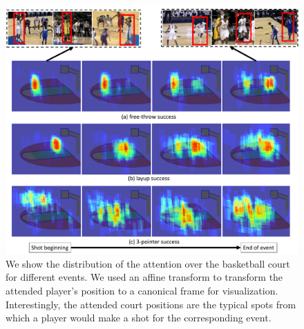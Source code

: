\begin{figure}[t!]
\begin{center}
  \includegraphics[width=7in]{images/heatmap_figure_v2_cropped.pdf}
\end{center}
   \caption{We show the distribution of the attention over the basketball court
     for different events. We used an affine transform to transform the
     attended player's position to a canonical frame for visualization.
     Interestingly, the attended court positions are the typical spots from
     which a player would make a shot for the corresponding event.
   }
\label{fig:att_heatmap}
\end{figure}

